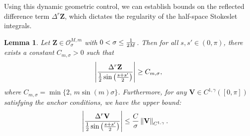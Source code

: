 \documentclass{amsart}
\newcommand{\mZ}{\mathbf{Z}}
\newcommand{\mV}{\mathbf{V}}
\newtheorem{lemma}[theorem]{Lemma}
\begin{document}
Using this dynamic geometric control, we can establish bounds on the reflected difference term $\Delta^r \mZ$, which dictates the regularity of the half-space Stokeslet integrals.

\begin{lemma} \label{l:deltar_bounds}
Let $\mZ \in \mathcal{O}^{M,m}_{\sigma}$ with $0 < \sigma \leq {1\over 2M}$. Then for all $s,s' \in (0,\pi)$, there exists a constant $C_{m,\sigma} > 0$ such that
\begin{equation} \label{e:Deltarlower}
\left| { \Delta^r \mZ \over {1\over2} \sin \left( { s+ s' \over 2} \right) }  \right|  \geq C_{m,\sigma},
\end{equation}
where $C_{m,\sigma} = \min\{2,\, m\sin(m)\sigma\}$. Furthermore, for any $\mV \in C^{1,\gamma}([0,\pi])$ satisfying the anchor conditions, we have the upper bound:
\begin{align} \label{e:Deltarupper}
\left| { \Delta^r \mV \over {1\over2} \sin \left( { s+ s' \over 2} \right) }  \right|
& \leq {C \over \sigma} \left\| \mV \right\|_{C^{1,\gamma}}.
\end{align}
\end{lemma}
\end{document}
